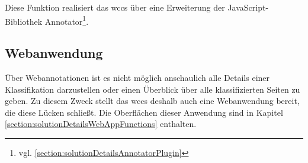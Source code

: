         Diese Funktion realisiert das \gls{wccs} über eine Erweiterung der JavaScript-Bibliothek
        Annotator\footnote{vgl. \ref{section:solutionDetailsAnnotatorPlugin}}.
    
    \subsection{Webanwendung}
        \label{section:solutionConceptWebApp}
        Über Webannotationen ist es nicht möglich anschaulich alle Details einer Klassifikation darzustellen
        oder einen Überblick über alle klassifizierten Seiten zu geben.
        Zu diesem Zweck stellt das \gls{wccs} deshalb auch eine Webanwendung bereit,
        die diese Lücken schließt.
        Die Oberflächen dieser Anwendung sind in Kapitel \ref{section:solutionDetailsWebAppFunctions}
        enthalten.
